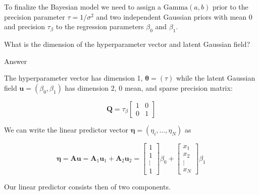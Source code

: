 \documentclass[
  letterpaper,
  DIV=11,
  numbers=noendperiod]{scrartcl}
\begin{document}
To finalize the Bayesian model we need to assign a \(\text{Gamma}(a,b)\)
prior to the precision parameter \(\tau = 1/\sigma^2\) and two
independent Gaussian priors with mean \(0\) and precision
\(\tau_{\beta}\) to the regression parameters \(\beta_0\) and
\(\beta_1\).

\begin{tcolorbox}[enhanced jigsaw, opacitybacktitle=0.6, rightrule=.15mm, colframe=quarto-callout-tip-color-frame, leftrule=.75mm, opacityback=0, colback=white, bottomtitle=1mm, arc=.35mm, coltitle=black, titlerule=0mm, breakable, toptitle=1mm, left=2mm, toprule=.15mm, bottomrule=.15mm, title={Question}, colbacktitle=quarto-callout-tip-color!10!white]

What is the dimension of the hyperparameter vector and latent Gaussian
field?

Answer

The hyperparameter vector has dimension 1, \(\pmb{\theta} = (\tau)\)
while the latent Gaussian field \(\pmb{u} = (\beta_0, \beta_1)\) has
dimension 2, \(0\) mean, and sparse precision matrix:

\[
\pmb{Q} = \tau_{\beta}\begin{bmatrix}
1 & 0\\
0 & 1
\end{bmatrix}
\]

\end{tcolorbox}

\begin{tcolorbox}[enhanced jigsaw, opacitybacktitle=0.6, rightrule=.15mm, colframe=quarto-callout-note-color-frame, leftrule=.75mm, opacityback=0, colback=white, bottomtitle=1mm, arc=.35mm, coltitle=black, titlerule=0mm, breakable, toptitle=1mm, left=2mm, toprule=.15mm, bottomrule=.15mm, title=\textcolor{quarto-callout-note-color}{\faInfo}\hspace{0.5em}{Note}, colbacktitle=quarto-callout-note-color!10!white]

We can write the linear predictor vector
\(\pmb{\eta} = (\eta_i,\dots,\eta_N)\) as

\[
\pmb{\eta} = \pmb{A}\pmb{u} = \pmb{A}_1\pmb{u}_1 + \pmb{A}_2\pmb{u}_2 = \begin{bmatrix}
1 \\
1\\
\vdots\\
1
\end{bmatrix} \beta_0 + \begin{bmatrix}
x_1 \\
x_2\\
\vdots\\
x_N
\end{bmatrix} \beta_1
\]

Our linear predictor consists then of two components.

\end{tcolorbox}
\end{document}
